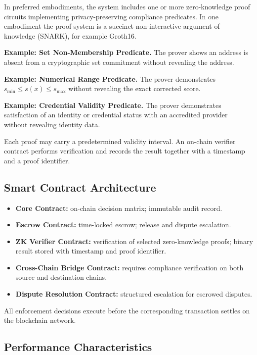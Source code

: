 \documentclass[12pt,a4paper]{article}
\begin{document}
In preferred embodiments, the system includes one or more zero-knowledge proof
circuits implementing privacy-preserving compliance predicates. In one
embodiment the proof system is a succinct non-interactive argument of
knowledge (SNARK), for example Groth16.

\textbf{Example: Set Non-Membership Predicate.}
The prover shows an address is absent from a cryptographic set commitment
without revealing the address.

\textbf{Example: Numerical Range Predicate.}
The prover demonstrates $s_{\min}\leq s(x)\leq s_{\max}$ without
revealing the exact corrected score.

\textbf{Example: Credential Validity Predicate.}
The prover demonstrates satisfaction of an identity or credential status with
an accredited provider without revealing identity data.

Each proof may carry a predetermined validity interval. An on-chain verifier
contract performs verification and records the result together with a
timestamp and a proof identifier.

\subsection{Smart Contract Architecture}
\label{sec:sc}

\begin{itemize}
\item \textbf{Core Contract:} on-chain decision matrix; immutable audit
record.
\item \textbf{Escrow Contract:} time-locked escrow; release and dispute
escalation.
\item \textbf{ZK Verifier Contract:} verification of selected zero-knowledge
proofs; binary result stored with timestamp and proof identifier.
\item \textbf{Cross-Chain Bridge Contract:} requires compliance
verification on both source and destination chains.
\item \textbf{Dispute Resolution Contract:} structured escalation for
escrowed disputes.
\end{itemize}

All enforcement decisions execute before the corresponding transaction
settles on the blockchain network.

\subsection{Performance Characteristics}
\label{sec:perf}
\end{document}
